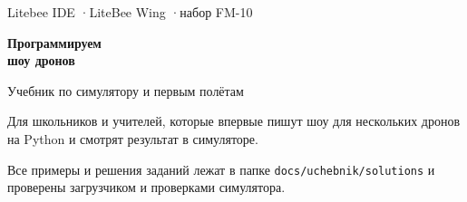 \begin{titlepage}
  \thispagestyle{empty}
  \vspace*{3.2cm}
  {\sffamily\color{inkgray}\large Litebee IDE \quad·\quad LiteBee Wing \quad·\quad набор FM-10\par}
  \vspace{1.2cm}
  {\sffamily\bfseries\color{accent}\fontsize{34}{40}\selectfont Программируем\\шоу дронов\par}
  \vspace{0.8cm}
  {\sffamily\color{ink}\Large Учебник по симулятору и первым полётам\par}
  \vspace{1.4cm}
  \vfill
  {\sffamily\color{inkgray}\small
  Для школьников и учителей, которые впервые пишут шоу для нескольких дронов на Python и смотрят результат в симуляторе.\par
  \medskip
  Все примеры и решения заданий лежат в папке \texttt{docs/uchebnik/solutions} и проверены загрузчиком и проверками симулятора.\par}
\end{titlepage}
